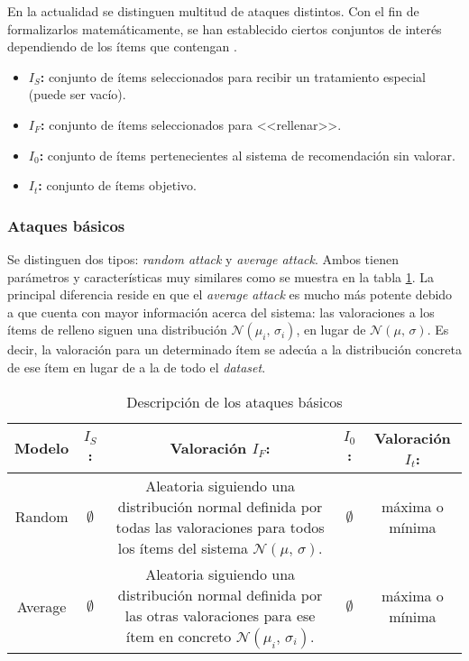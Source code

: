 En la actualidad se distinguen multitud de ataques distintos. Con el fin de formalizarlos matemáticamente, se han establecido ciertos conjuntos de interés dependiendo de los ítems que contengan \cite{zhou2021SemisupervisedRecommendationAttack}.

\begin{itemize}
	
	\item \textbf{$I_S$:} conjunto de ítems seleccionados para recibir un tratamiento especial (puede ser vacío).
	\item \textbf{$I_F$:} conjunto de ítems seleccionados para <<rellenar>>.
	\item \textbf{$I_0$:} conjunto de ítems pertenecientes al sistema de recomendación sin valorar.
	\item \textbf{$I_t$:} conjunto de ítems objetivo.
	
\end{itemize}


\subsubsection{Ataques básicos}

Se distinguen dos tipos: \textit{random attack} y \textit{average attack}. Ambos tienen parámetros y características muy similares como se muestra en la tabla \ref{tabla_descripcion_ataques_basicos}. La principal diferencia reside en que el \textit{average attack} es mucho más potente debido a que cuenta con mayor información acerca del sistema: las valoraciones a los ítems de relleno siguen una distribución $\mathcal{N}(\mu_i,\,\sigma_i)$, en lugar de $\mathcal{N}(\mu,\,\sigma)$. Es decir, la valoración para un determinado ítem se adecúa a la distribución concreta de ese ítem en lugar de a la de todo el \textit{dataset}.

\begin{table}
	\centering
	\resizebox{15cm}{!} {
		\begin{tabular}{|c c c c c|}
		\hline
		
		Modelo & \textbf{$I_S$:} & Valoración \textbf{$I_F$:} & \textbf{$I_0$:} & Valoración \textbf{$I_t$:} \\\hline \hline
	
		Random & $\emptyset$ & \parbox{20em}{Aleatoria siguiendo una distribución normal definida por todas las valoraciones para todos los ítems del sistema $\mathcal{N}(\mu,\,\sigma)$.} & $\emptyset$ & máxima o mínima \\\hline
		
		Average & $\emptyset$ & \parbox{20em}{Aleatoria siguiendo una distribución normal definida por las otras valoraciones para ese ítem en concreto $\mathcal{N}(\mu_i,\,\sigma_i)$.} & $\emptyset$ & máxima o mínima \\\hline
		\end{tabular}
	}
	\caption{Descripción de los ataques básicos}
	\label{tabla_descripcion_ataques_basicos}	
\end{table}


